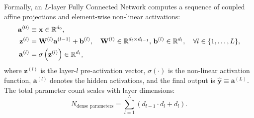 Formally, an $L$-layer Fully Connected Network computes a sequence of coupled affine projections and element-wise non-linear activations:
\begin{align}
\mathbf{a}^{(0)} &\equiv \mathbf{x} \in \mathbb{R}^{d_0}, \label{eq:fcn_input} \\
\mathbf{z}^{(l)} &= \mathbf{W}^{(l)} \mathbf{a}^{(l-1)} + \mathbf{b}^{(l)}, \quad \mathbf{W}^{(l)} \in \mathbb{R}^{d_l \times d_{l-1}}, \, \mathbf{b}^{(l)} \in \mathbb{R}^{d_l}, \quad \forall l \in \{1, \dots, L\}, \label{eq:fcn_preactivation} \\
\mathbf{a}^{(l)} &= \sigma\left( \mathbf{z}^{(l)} \right) \in \mathbb{R}^{d_l}, \label{eq:fcn_activation}
\end{align}
where $\mathbf{z}^{(l)}$ is the layer-$l$ pre-activation vector, $\sigma(\cdot)$ is the non-linear activation function, $\mathbf{a}^{(l)}$ denotes the hidden activations, and the final output is $\hat{\mathbf{y}} \equiv \mathbf{a}^{(L)}$. The total parameter count scales with layer dimensions:
\begin{equation}
N_{\text{dense parameters}} = \sum_{l=1}^L \left( d_{l-1} \cdot d_l + d_l \right).
\label{eq:dense_parameter_count}
\end{equation}

